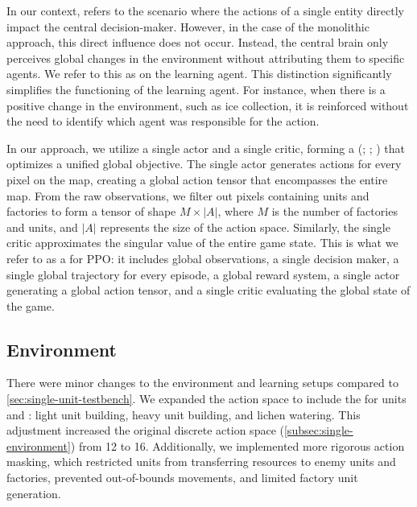 \bigskip

\noindent In our context,  refers to the scenario where the actions of a single entity directly impact the central decision-maker. However, in the case of the monolithic approach, this direct influence does not occur. Instead, the central brain only perceives global changes in the environment without attributing them to specific agents. We refer to this as  on the learning agent. This distinction significantly simplifies the functioning of the learning agent. For instance, when there is a positive change in the environment, such as ice collection, it is reinforced without the need to identify which agent was responsible for the action.

\bigskip

\noindent In our approach, we utilize a single actor and a single critic, forming a  (\cite{eysenbach2023connection}; \cite{gai2024singletask}; \cite{mysore2022multicritic}) that optimizes a unified global objective. The single actor generates actions for every pixel on the map, creating a global action tensor that encompasses the entire map. From the raw observations, we filter out pixels containing units and factories to form a tensor of shape $M\times|A|$, where $M$ is the number of factories and units, and $|A|$ represents the size of the action space. Similarly, the single critic approximates the singular value of the entire game state. This is what we refer to as a  for PPO: it includes global observations, a single decision maker, a single global trajectory for every episode, a global reward system, a single actor generating a global action tensor, and a single critic evaluating the global state of the game.

\subsection{Environment}
\label{subsec:mono-environment}

\noindent There were minor changes to the environment and learning setups compared to \autoref{sec:single-unit-testbench}. We expanded the action space to include the  for units and : light unit building, heavy unit building, and lichen watering. This adjustment increased the original discrete action space (\autoref{subsec:single-environment}) from 12 to 16. Additionally, we implemented more rigorous action masking, which restricted units from transferring resources to enemy units and factories, prevented out-of-bounds movements, and limited factory unit generation.

